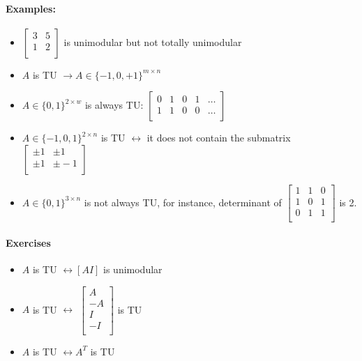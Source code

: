 \documentclass[main]{subfiles}
\begin{document}
\paragraph{Examples:}
\begin{itemize}
\item
$\begin{bmatrix}
3 & 5\\
1 & 2 \\
\end{bmatrix}$ is unimodular but not totally unimodular
\item $A$ is TU $\rightarrow A \in \{-1, 0, +1\}^{m \times n}$
\item $A \in \{0, 1\}^{2 \times w}$ is always TU: 
$\begin{bmatrix}
0 & 1 & 0 & 1 & \dots \\
1 & 1 & 0 & 0 & \dots \\
\end{bmatrix}$
\item $A \in \{-1, 0, 1\}^{2 \times n}$ is TU $\leftrightarrow$ it does not
contain the submatrix 
$\begin{bmatrix}
\pm 1 & \pm 1 \\
\pm 1 & \pm -1  \\
\end{bmatrix}$
\item $A \in \{0,1\}^{3 \times n}$ is not always TU, for instance, determinant
of 
$\begin{bmatrix}
1 & 1 & 0 \\
1 & 0 & 1 \\
0 & 1 & 1 \\
\end{bmatrix}$ is 2.
\end{itemize}

\paragraph{Exercises}
\begin{itemize}
\item $A$ is TU $\leftrightarrow [AI]$ is unimodular
\item $A$ is TU $\leftrightarrow$
$\begin{bmatrix}
A \\
-A \\
I \\
-I \\
\end{bmatrix}$ is TU
\item $A$ is TU $\leftrightarrow A^{T}$ is TU
\end{itemize}
\end{document}
